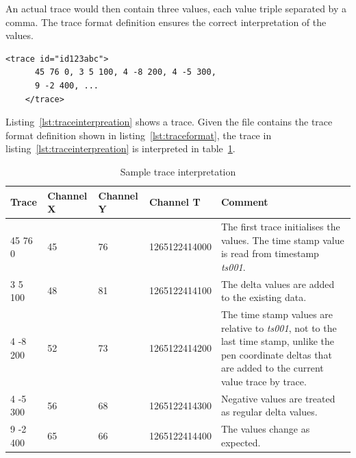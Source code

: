An actual trace would then contain three values, each value triple separated by
a comma. The trace format definition ensures the correct interpretation of the 
values.
\begin{xmlcode}
  \begin{lstlisting}[emph={trace,channel},
                     emphstyle=\color{blue}\textbf,
                     emph={[2]name,type,units,respectTo,id},
                     emphstyle={[2]\color{red}},
                     caption={A sample trace},
                     label=lst:traceinterpreation]
    <trace id="id123abc">
      45 76 0, 3 5 100, 4 -8 200, 4 -5 300,
      9 -2 400, ...
    </trace>
  \end{lstlisting}
\end{xmlcode}
Listing~\ref{lst:traceinterpreation} shows a trace. Given the file contains
the trace format definition shown in listing~\ref{lst:traceformat}, the trace 
in listing~\ref{lst:traceinterpreation} is interpreted in 
table~\ref{table:sampletraceinterpretation}. 

\begin{table}[htbp]
\begin{center}
  \begin{tabular}{|l||l|l|l|p{200pt}|}
    \hline
    Trace & Channel X & Channel Y & Channel T & Comment \\
    \hline
    45 76 0 & 45 & 76  & 1265122414000 & The first trace initialises 
                                         the values. The time stamp value is
                                         read from timestamp \emph{ts001}. \\
    \hline
    3 5 100 & 48 & 81 &  1265122414100 & The delta values are added to the
                                         existing data. \\
    \hline
    4 -8 200 & 52 & 73 &  1265122414200 & The time stamp values are relative to
                                          \emph{ts001}, not to the last time 
                                          stamp, unlike the pen coordinate 
                                          deltas that are added to the current 
                                          value trace by trace. \\
    \hline
    4 -5 300 & 56 & 68 &  1265122414300 & Negative values are treated as regular
                                          delta values. \\
    \hline
    9 -2 400 & 65 & 66 &  1265122414400 & The values change as expected. \\
    \hline
  \end{tabular}
\end{center}
\caption{Sample trace interpretation}
\label{table:sampletraceinterpretation}
\end{table}

